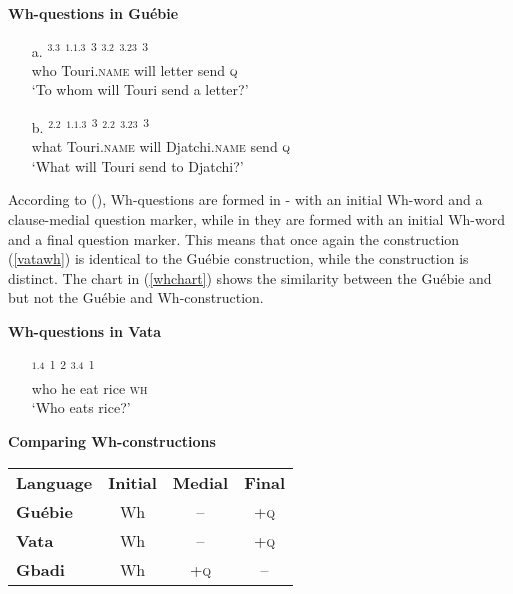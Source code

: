 \documentclass[output=paper,modfonts]{langscibook}
\begin{document}
\begin{exe}
\ex \textbf{Wh-questions in Guébie}
\begin{itemize}
\item[a.] \gll {}$^{3.3}$ $^{1.1.3}$ %
\textsuperscript{3} $^{3.2}$ $^{3.23}$ \textsuperscript{3}\\
who Touri.\textsc{name} %
will letter send \textsc{q}\\
\trans `To whom will Touri send a letter?'
\item[b.] \gll {}$^{2.2}$ $^{1.1.3}$ %
\textsuperscript{3} $^{2.2}$ $^{3.23}$ \textsuperscript{3}\\
what Touri.\textsc{name} %
will Djatchi.\textsc{name} send \textsc{q}\\
\trans `What will Touri send to Djatchi?'
\end{itemize}
\end{exe}

According to (\citealt[87]{Koopman1984}), Wh-questions are formed in - with an initial Wh-word and a clause-medial question marker, while in  they are formed with an initial Wh-word and a final question marker. This means that once again the  construction (\ref{vatawh}) is identical to the Guébie construction, while the  construction is distinct. The chart in (\ref{whchart}) shows the similarity between the Guébie and  but not the Guébie and  Wh-construction.
\newpage 

\begin{exe}
\begin{samepage}
\ex \textbf{Wh-questions in Vata}\label{vatawh}
\begin{itemize}
\item[ ] \gll {}$^{1.4}$ \textsuperscript{1} \textsuperscript{2} $^{3.4}$ \textsuperscript{1}\\
who he eat rice \textsc{wh}\\
\nopagebreak
\trans `Who eats rice?'
\end{itemize}


\ex \textbf{Comparing Wh-constructions}\label{whchart}\\
\begin{tabular}{lccc}
\textbf{Language} & \textbf{Initial} & \textbf{Medial} & \textbf{Final}\\
\textbf{Guébie} & Wh & -- & +\textsc{q}\\
\textbf{Vata} & Wh & -- & +\textsc{q}\\
\textbf{Gbadi} & Wh & +\textsc{q} & --\\
\end{tabular}
\end{samepage}
\end{exe}
\end{document}
